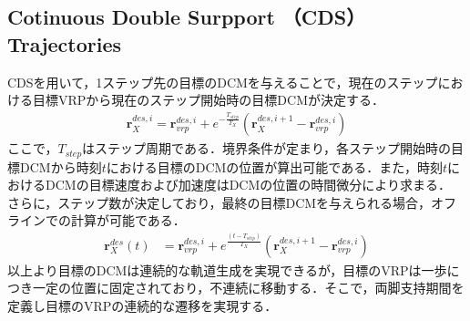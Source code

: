 \documentclass[twocolumn]{jsarticle}
\begin{document}
\subsection{Cotinuous Double Surpport （CDS）Trajectories}
CDSを用いて，1ステップ先の目標のDCMを与えることで，現在のステップにおける目標VRPから現在のステップ開始時の目標DCMが決定する．
\begin{align}
  \bm{r}_X^{des,i}=
  \bm{r}_{vrp}^{des,i}
  +e^{-\frac{T_{step}}{T_X}}(\bm{r}_{X}^{des,i+1}-\bm{r}_{vrp}^{des,i})
\end{align}
ここで，$T_{step}$はステップ周期である．境界条件が定まり，各ステップ開始時の目標DCMから時刻$t$における目標のDCMの位置が算出可能である．また，時刻$t$におけるDCMの目標速度および加速度はDCMの位置の時間微分により求まる．
さらに，ステップ数が決定しており，最終の目標DCMを与えられる場合，オフラインでの計算が可能である．
\begin{align}
  \bm{r}_X^{des}(t)&= \bm{r}_{vrp}^{des,i}+e^{\frac{(t-T_{step})}{T_X}}(\bm{r}_{X}^{des,i+1}-\bm{r}_{vrp}^{des,i})
\end{align}
以上より目標のDCMは連続的な軌道生成を実現できるが，目標のVRPは一歩につき一定の位置に固定されており，不連続に移動する．そこで，両脚支持期間を定義し目標のVRPの連続的な遷移を実現する．
\end{document}
